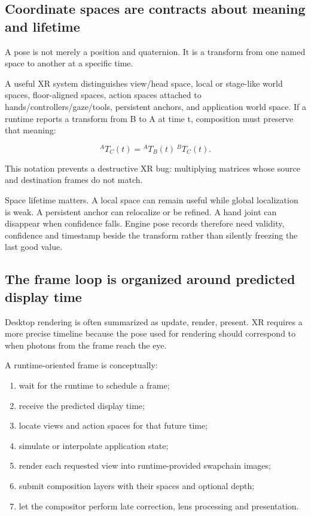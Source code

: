 \subsection{Coordinate spaces are contracts about meaning and lifetime}\label{coordinate-spaces-are-contracts-about-meaning-and-lifetime}

A pose is not merely a position and quaternion. It is a transform from one named space to another at a specific time.

A useful XR system distinguishes view/head space, local or stage-like world spaces, floor-aligned spaces, action spaces attached to hands/controllers/gaze/tools, persistent anchors, and application world space. If a runtime reports a transform from B to A at time t, composition must preserve that meaning:

\[
{}^AT_C(t) = {}^AT_B(t)\,{}^BT_C(t).
\]

This notation prevents a destructive XR bug: multiplying matrices whose source and destination frames do not match.

Space lifetime matters. A local space can remain useful while global localization is weak. A persistent anchor can relocalize or be refined. A hand joint can disappear when confidence falls. Engine pose records therefore need validity, confidence and timestamp beside the transform rather than silently freezing the last good value.

\subsection{The frame loop is organized around predicted display time}\label{the-frame-loop-is-organized-around-predicted-display-time}

Desktop rendering is often summarized as update, render, present. XR requires a more precise timeline because the pose used for rendering should correspond to when photons from the frame reach the eye.

A runtime-oriented frame is conceptually:

\begin{enumerate}
\def\labelenumi{\arabic{enumi}.}
\tightlist
\item
  wait for the runtime to schedule a frame;
\item
  receive the predicted display time;
\item
  locate views and action spaces for that future time;
\item
  simulate or interpolate application state;
\item
  render each requested view into runtime-provided swapchain images;
\item
  submit composition layers with their spaces and optional depth;
\item
  let the compositor perform late correction, lens processing and presentation.
\end{enumerate}

